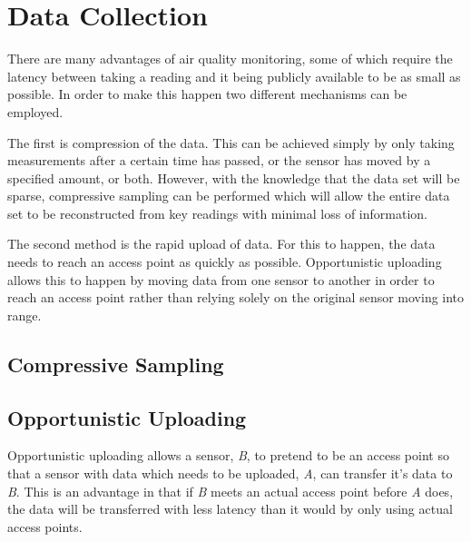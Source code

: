 \section{Data Collection}\label{datacollection}

There are many advantages of air quality monitoring, some of which require the latency between taking a reading and it being publicly available to be as small as possible. In order to make this happen two different mechanisms can be employed. 

The first is compression of the data. This can be achieved simply by only taking measurements after a certain time has passed, or the sensor has moved by a specified amount, or both. However, with the knowledge that the data set will be sparse, compressive sampling can be performed which will allow the entire data set to be reconstructed from key readings with minimal loss of information. 

The second method is the rapid upload of data. For this to happen, the data needs to reach an access point as quickly as possible. Opportunistic uploading allows this to happen by moving data from one sensor to another in order to reach an access point rather than relying solely on the original sensor moving into range. 

\subsection{Compressive Sampling}\label{compressivesampling} 



\subsection{Opportunistic Uploading}\label{opportunisticuploading}

Opportunistic uploading allows a sensor, \emph{B}, to pretend to be an access point so that a sensor with data which needs to be uploaded, \emph{A}, can transfer it's data to \emph{B}. This is an advantage in that if \emph{B} meets an actual access point before \emph{A} does, the data will be transferred with less latency than it would by only using actual access points. 

